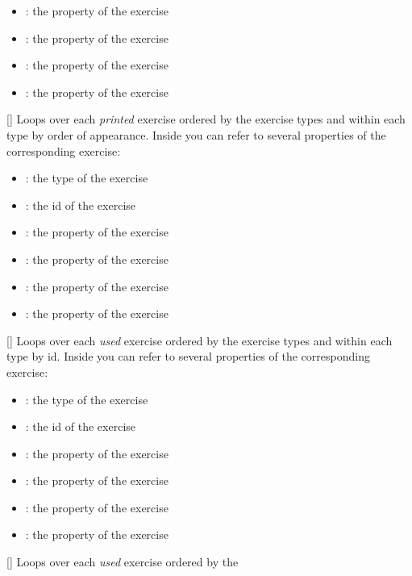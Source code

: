 \documentclass{xsim-manual}
\begin{document}
\begin{commands}
\begin{itemize}
      \item {}: the  property of the exercise
      \item {}: the  property of the exercise
      \item {}: the  property of the exercise
      \item {}: the  property of the exercise
    \end{itemize}
  []
    Loops over each \emph{printed} exercise ordered by the
    exercise types and within each type by order of appearance.  Inside
     you can refer to several properties of the corresponding
    exercise:
    \begin{itemize}
      \item {}: the type of the exercise
      \item {}: the id of the exercise
      \item {}: the  property of the exercise
      \item {}: the  property of the exercise
      \item {}: the  property of the exercise
      \item {}: the  property of the exercise
    \end{itemize}
  []
    Loops over each \emph{used} exercise ordered by the exercise types and
    within each type by id.  Inside  you can refer to several
    properties of the corresponding exercise:
    \begin{itemize}
      \item {}: the type of the exercise
      \item {}: the id of the exercise
      \item {}: the  property of the exercise
      \item {}: the  property of the exercise
      \item {}: the  property of the exercise
      \item {}: the  property of the exercise
    \end{itemize}
  []
    Loops over each \emph{used} exercise ordered by the

\end{commands}
\end{document}
